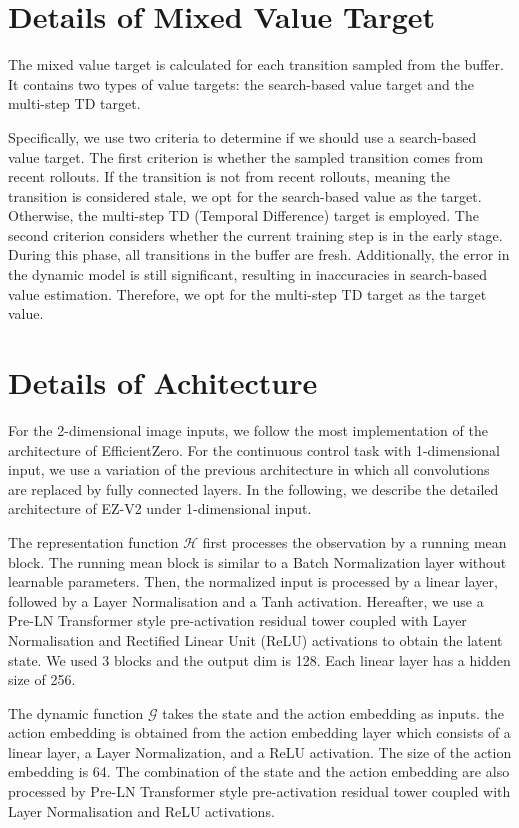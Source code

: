 \section{Details of Mixed Value Target}
\label{mixedV}
The mixed value target is calculated for each transition sampled from the buffer. It contains two types of value targets: the search-based value target and the multi-step TD target.

Specifically, we use two criteria to determine if we should use a search-based value target. The first criterion is whether the sampled transition comes from recent rollouts. If the transition is not from recent rollouts, meaning the transition is considered stale, we opt for the search-based value as the target. Otherwise, the multi-step TD (Temporal Difference) target is employed. The second criterion considers whether the current training step is in the early stage. During this phase, all transitions in the buffer are fresh. Additionally, the error in the dynamic model is still significant, resulting in inaccuracies in search-based value estimation. Therefore, we opt for the multi-step TD target as the target value.

\section{Details of Achitecture}
\label{arch}
For the 2-dimensional image inputs, we follow the most implementation of the architecture of EfficientZero. For the continuous control task with 1-dimensional input, we use a variation of the previous architecture in which all convolutions are replaced by fully connected layers. In the following, we describe the detailed architecture of EZ-V2 under 1-dimensional input.

The representation function $\mathcal{H}$ first processes the observation by a running mean block. The running mean block is similar to a Batch Normalization layer without learnable parameters. Then, the normalized input is processed by a linear layer, followed by a Layer Normalisation and a Tanh activation. Hereafter, we use a Pre-LN Transformer style pre-activation residual tower \citep{xiong2020layer} coupled with Layer Normalisation and Rectified Linear Unit (ReLU) activations to obtain the latent state. We used 3 blocks and the output dim is 128. Each linear layer has a hidden size of 256.

The dynamic function $\mathcal{G}$ takes the state and the action embedding as inputs. the action embedding is obtained from the action embedding layer which consists of a linear layer, a Layer Normalization, and a ReLU activation. The size of the action embedding is 64. The combination of the state and the action embedding are also processed by Pre-LN Transformer style pre-activation residual tower \citep{xiong2020layer} coupled with Layer Normalisation and ReLU activations. 

